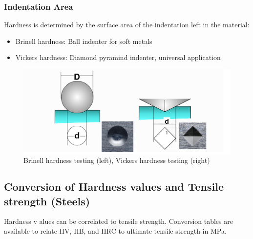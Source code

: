 \documentclass{article}
\begin{document}
\subsubsection{Indentation Area}
Hardness is determined by the surface area of the indentation left in the material:
\begin{itemize}
  \item Brinell hardness: Ball indenter for soft metals
  \item Vickers hardness: Diamond pyramind indenter, universal application
\end{itemize}

\begin{figure}[ht!]
  \centering
  \includegraphics[width=.6\textwidth]{media/area_hardness.png}
  \caption*{Brinell hardness testing (left), Vickers hardness testing (right)}
\end{figure}

\newpage
\subsection{Conversion of Hardness values and Tensile strength (Steels)}
Hardness v alues can be correlated to tensile strength. Conversion tables are available to
relate HV, HB, and HRC to ultimate tensile strength in MPa.
\end{document}
